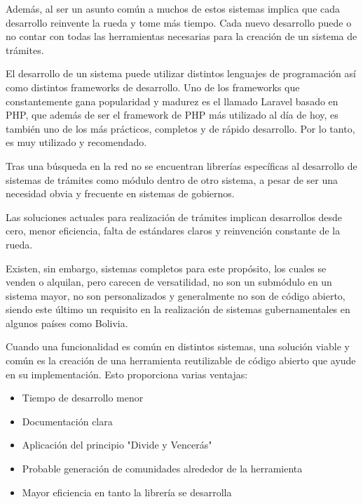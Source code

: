 Además, al ser un asunto común a muchos de estos sistemas implica que cada desarrollo reinvente la rueda y tome más tiempo. Cada nuevo desarrollo puede o no contar con todas las herramientas necesarias para la creación de un sistema de trámites.

El desarrollo de un sistema puede utilizar distintos lenguajes de programación así como distintos frameworks de desarrollo. Uno de los frameworks que constantemente gana popularidad y madurez es el llamado Laravel basado en PHP, que además de ser el framework de PHP más utilizado al día de hoy, es también uno de los más prácticos, completos y de rápido desarrollo. Por lo tanto, es muy utilizado y recomendado.

Tras una búsqueda en la red no se encuentran librerías específicas al desarrollo de sistemas de trámites como módulo dentro de otro sistema, a pesar de ser una necesidad obvia y frecuente en sistemas de gobiernos.

Las soluciones actuales para realización de trámites implican desarrollos desde cero, menor eficiencia, falta de estándares claros  y reinvención constante de la rueda.

Existen, sin embargo, sistemas completos para este propósito, los cuales se venden o alquilan, pero carecen de versatilidad, no son un submódulo en un sistema mayor, no son personalizados y generalmente no son de código abierto, siendo este último un requisito en la realización de sistemas gubernamentales en algunos países como Bolivia.

Cuando una funcionalidad es común en distintos sistemas, una solución viable y común es la creación de una herramienta reutilizable de código abierto que ayude en su implementación. Esto proporciona varias ventajas:

\begin{itemize}
    \item Tiempo de desarrollo menor
    \item Documentación clara 
    \item Aplicación del principio "Divide y Vencerás"
    \item Probable generación de comunidades alrededor de la herramienta
    \item Mayor eficiencia en tanto la librería se desarrolla 
\end{itemize}



